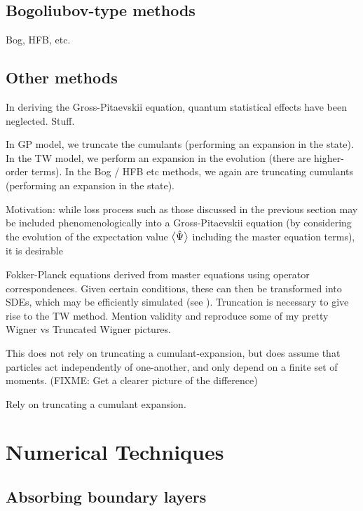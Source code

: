 \subsection{Bogoliubov-type methods}
\label{BackgroundTheory:BogoliubovMethods}

Bog, HFB, etc.

\subsection{Other methods}

In deriving the Gross-Pitaevskii equation, quantum statistical effects have been neglected.  Stuff.

In GP model, we truncate the cumulants (performing an expansion in the state).  In the TW model, we perform an expansion in the evolution (there are higher-order terms).  In the Bog / HFB etc methods, we again are truncating cumulants (performing an expansion in the state).



Motivation:  while loss process such as those discussed in the previous section may be included phenomenologically into a Gross-Pitaevskii equation (by considering the evolution of the expectation value ${\big<\hat{\Psi}\big>}$ including the master equation terms), it is desirable 



Fokker-Planck equations derived from master equations using operator correspondences.  Given certain conditions, these can then be transformed into SDEs, which may be efficiently simulated (see ).  Truncation is necessary to give rise to the TW method.  Mention validity and reproduce some of my pretty Wigner vs Truncated Wigner pictures.  

This does not rely on truncating a cumulant-expansion, but does assume that particles act independently of one-another, and only depend on a finite set of moments. (FIXME: Get a clearer picture of the difference)

Rely on truncating a cumulant expansion.

\section{Numerical Techniques}
\label{BackgroundTheory:NumericalTechniques}
\subsection{Absorbing boundary layers}
